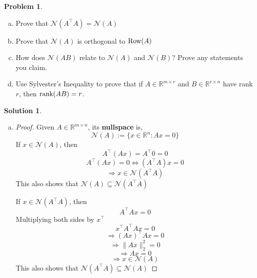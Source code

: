 \documentclass{amsart}[11pt]
\theoremstyle{definition}
\newtheorem{problem}{Problem}
\newtheorem{solution}{Solution}
\newcommand{\R}{\mathbb{R}}
\providecommand{\norm}[1]{\lVert#1\rVert}
\newcommand{\row}{\textnormal{Row}}
\newcommand{\rank}{\textnormal{rank}}
\begin{document}
\begin{problem}
\begin{enumerate}[(a)]
    \item Prove that $\mathcal{N}(A^\top A)=\mathcal{N}(A)$
    \item Prove that $\mathcal{N}(A)$ is orthogonal to $\row(A)$
    \item How does $\mathcal{N}(AB)$ relate to $\mathcal{N}(A)$ and $\mathcal{N}(B)$? Prove any statements you claim.
    \item Use Sylvester's Inequality to prove that if $A\in\R^{m\times r}$ and $B\in\R^{r\times n}$ have rank $r$, then $\rank(AB)=r$.
\end{enumerate}
\begin{solution}
    \begin{enumerate}[(a)]
        \item \begin{proof}
            Given $A\in\R^{m\times n}$, its \textbf{nullspace} is, 
            \[ \mathcal{N}(A):=\{x\in\R^n:Ax=0\} \]
            If $x\in\mathcal{N}(A)$, then
            \[A^\top(Ax)=A^\top0=0\]
            \[A^\top(Ax)=0\Leftrightarrow (A^\top A)x=0\]
            \[\Rightarrow x\in\mathcal{N}(A^\top A)\]
            This also shows that $\mathcal{N}(A) \subseteq \mathcal{N}(A^\top A)$

            \vspace{\baselineskip}
            \noindent If $x\in\mathcal{N}(A^\top A)$, then
            \[A^\top Ax=0\]
            Multiplying both sides by $x^\top$
            \[x^\top A^\top Ax=0\]
            \[\Rightarrow (Ax)^\top Ax=0\]
            \[\Rightarrow \norm{Ax}_2^2=0\]
            \[\Rightarrow Ax=0\] 
            \[\Rightarrow x\in\mathcal{N}(A)\] 
            This also shows that $\mathcal{N}(A^\top A) \subseteq \mathcal{N}(A) $
            

\end{proof}
\end{enumerate}
\end{solution}
\end{problem}
\end{document}
